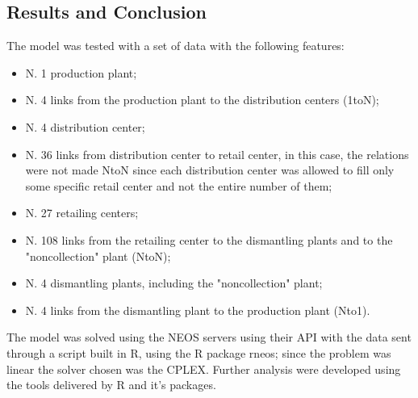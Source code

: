 \begin{doublespace}
\section{Results and Conclusion}
The model was tested with a set of data with the following features:

\begin{itemize}
    \item N. 1 production plant;
    \item N. 4 links from the production plant to the distribution centers (1toN);
    \item N. 4 distribution center;
    \item N. 36 links from distribution center to retail center, in this case, the relations were not made NtoN since each distribution center was allowed to fill only some specific retail center and not the entire number of them;
    \item N. 27 retailing centers;
    \item N. 108 links from the retailing center to the dismantling plants and to the "noncollection" plant (NtoN);
    \item N. 4 dismantling plants, including the "noncollection" plant;
    \item N. 4 links from the dismantling plant to the production plant (Nto1).
\end{itemize}

The model was solved using the NEOS servers using their API with the data sent through a script built in R, using the R package rneos; since the problem was linear the solver chosen was the CPLEX. Further analysis were developed using the tools delivered by R and it's packages.


\end{doublespace}

